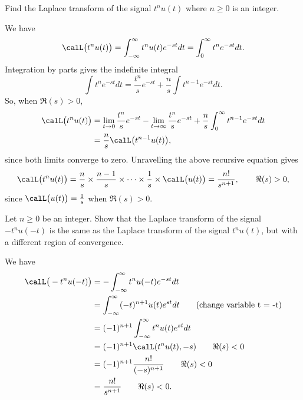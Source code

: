 \begin{excersizelist}
\begin{solution}
\begin{center}
\end{center}
\end{solution}

\item \label{excer:laplacetransformcommonpolyut} Find the Laplace transform of the signal $t^n u(t)$ where $n\geq 0$ is an integer.
\begin{solution}
We have
\[
\calL\big(t^nu(t)\big) = \int_{-\infty}^{\infty} t^nu(t) e^{-st} dt = \int_{0}^{\infty} t^n e^{-st} dt.
\]
Integration by parts gives the indefinite integral
\[
\int t^n e^{-st} dt = \frac{t^n}{s} e^{-st} + \frac{n}{s} \int t^{n-1} e^{-st} dt.
\]
So, when $\Re(s) > 0$,
\begin{align*}
\calL\big(t^nu(t)\big) &= \lim_{t \to 0}\frac{t^n}{s} e^{-st} - \lim_{t \to \infty}\frac{t^n}{s} e^{-st} + \frac{n}{s} \int_{0}^\infty t^{n-1} e^{-st} dt \\
&= \frac{n}{s} \calL\big(t^{n-1}u(t)\big),
\end{align*}
since both limits converge to zero.  Unravelling the above recursive equation gives
\[
\calL\big(t^nu(t)\big) = \frac{n}{s}\times\frac{n-1}{s}\times\cdots\times\frac{1}{s}\times\calL\big(u(t)\big) = \frac{n!}{s^{n+1}}, \qquad \Re(s) > 0,
\]
since $\calL\big(u(t)\big) = \tfrac{1}{s}$ when $\Re(s) >0$. 
\end{solution}

\item Let $n \geq 0$ be an integer.  Show that the Laplace transform of the signal $- t^n u(-t)$ is the same as the Laplace transform of the signal $t^n u(t)$, but with a different region of convergence.
\begin{solution}
We have
\begin{align*}
\calL\big(-t^nu(-t)\big) &= -\int_{-\infty}^{\infty} t^nu(-t) e^{-st} dt \\
&= \int_{-\infty}^{\infty} (-t)^{n+1} u(t) e^{st} dt \qquad \text{(change variable t = -t)} \\
&= (-1)^{n+1} \int_{-\infty}^{\infty} t^n u(t) e^{st} dt \\
&= (-1)^{n+1} \calL( t^n u(t), -s) \qquad \Re(s) < 0 \\
&= (-1)^{n+1} \frac{n!}{(-s)^{n+1}} \qquad \Re(s) < 0 \\
&= \frac{n!}{s^{n+1}} \qquad \Re(s) < 0.
\end{align*}
\end{solution}


\end{excersizelist}
